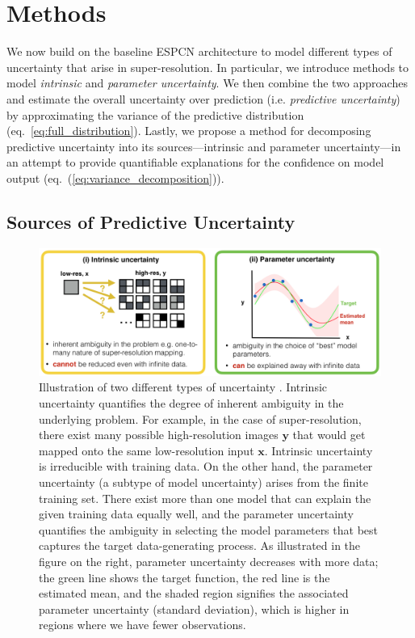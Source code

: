 \section{Methods} 
We now build on the baseline ESPCN architecture to model different types of uncertainty that arise in super-resolution. In particular, we introduce methods to model \textit{intrinsic} and \textit{parameter uncertainty}. We then combine the two approaches and estimate the overall uncertainty over prediction (i.e. \textit{predictive uncertainty}) by approximating the variance of the predictive distribution (eq.~\eqref{eq:full_distribution}). Lastly, we propose a method for decomposing predictive uncertainty into its sources---intrinsic and parameter uncertainty---in an attempt to provide quantifiable explanations for the confidence on model output (eq.~(\ref{eq:variance_decomposition})). 


\subsection{Sources of Predictive Uncertainty }
\begin{figure}[t]
	\includegraphics[width=0.95\linewidth]{chapter_3/figures/fig_intro.png}
	\centering	
	\caption{\small Illustration of two different types of uncertainty \cite{hora1996aleatory}. Intrinsic uncertainty \cite{wang1996intrinsic} quantifies the degree of inherent ambiguity in the underlying problem. For example, in the case of super-resolution, there exist many possible high-resolution images $\textbf{y}$ that would get mapped onto the same low-resolution input $\textbf{x}$. Intrinsic uncertainty is irreducible with training data. On the other hand, the parameter uncertainty \cite{draper1995assessment} (a subtype of model uncertainty) arises from the finite training set. There exist more than one model that can explain the given training data equally well, and the parameter uncertainty quantifies the ambiguity in selecting the model parameters that best captures the target data-generating process. As illustrated in the figure on the right, parameter uncertainty decreases with more data; the green line shows the target function, the red line is the estimated mean, and the shaded region signifies the associated parameter uncertainty (standard deviation), which is higher in regions where we have fewer observations.} 
	\label{fig:uncertainty_types}
\end{figure}

